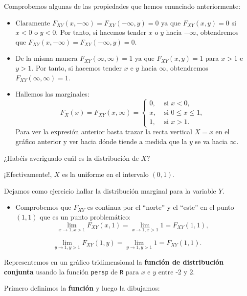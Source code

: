 \documentclass[
  letterpaper,
  DIV=11,
  numbers=noendperiod]{scrreprt}
\providecommand{\tightlist}{%
  \setlength{\itemsep}{0pt}\setlength{\parskip}{0pt}}\usepackage{longtable,booktabs,array}
\begin{document}
Comprobemos algunas de las propiedades que hemos enunciado
anteriormente:

\begin{itemize}
\item
  Claramente \(F_{XY}(x,-\infty)=F_{XY}(-\infty,y)=0\) ya que
  \(F_{XY}(x,y)=0\) si \(x<0\) o \(y<0\). Por tanto, si hacemos tender
  \(x\) o \(y\) hacia \(-\infty\), obtendremos que
  \(F_{XY}(x,-\infty)=F_{XY}(-\infty,y)=0\).
\item
  De la misma manera \(F_{XY}(\infty,\infty)=1\) ya que
  \(F_{XY}(x,y)=1\) para \(x>1\) e \(y>1\). Por tanto, si hacemos tender
  \(x\) e \(y\) hacia \(\infty\), obtendremos
  \(F_{XY}(\infty,\infty)=1\).
\item
  Hallemos las marginales: \[
  F_X(x)=F_{XY}(x,\infty)=\begin{cases}
  0, & \mbox{ si }x<0,\\
  x, & \mbox{ si } 0\leq x\leq 1,\\
  1, & \mbox{ si } x>1.
  \end{cases}
  \] Para ver la expresión anterior basta trazar la recta vertical
  \(X=x\) en el gráfico anterior y ver hacia dónde tiende a medida que
  la \(y\) se va hacia \(\infty\).
\end{itemize}

¿Habéis averiguado cuál es la distribución de \(X\)?

¡Efectivamente!, \(X\) es la uniforme en el intervalo \((0,1)\).

Dejamos como ejercicio hallar la distribución marginal para la variable
\(Y\).

\begin{itemize}
\tightlist
\item
  Comprobemos que \(F_{XY}\) es continua por el ``norte'' y el ``este''
  en el punto \((1,1)\) que es un punto problemático: \[
  \lim_{x\to 1,x> 1} F_{XY}(x,1)=\lim_{x\to 1,x> 1} 1  = F_{XY}(1,1),
  \]
\end{itemize}

\[
\lim_{y\to 1,y> 1} F_{XY}(1,y)=\lim_{y\to 1,y> 1} 1  = F_{XY}(1,1).
\]

Representemos en un gráfico tridimensional la \textbf{función de
distribución conjunta} usando la función \texttt{persp} de \texttt{R}
para \(x\) e \(y\) entre -2 y 2.

Primero definimos la \textbf{función} y luego la dibujamos:
\end{document}
